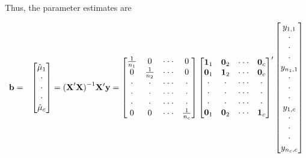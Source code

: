 Thus, the parameter estimates are

\begin{center}
\begin{eqnarray}\label{E4:OneFactorXPrimeXinvXPrimey}
\mathbf{b} &=&%
\begin{bmatrix}
\hat{\mu}_1 \\
\cdot  \\
\cdot  \\
\cdot  \\
\hat{\mu}_{c}%
\end{bmatrix}%
=\mathbf{(X}^{\prime}\mathbf{X)}^{-1}\mathbf{X}^{\prime}\mathbf{y}=%
\begin{bmatrix}
\frac{1}{n_1} & 0 & \cdot \cdot \cdot  & 0 \\
0 & \frac{1}{n_2} & \cdot \cdot \cdot  & 0 \\
\cdot  & \cdot  & \cdot \cdot \cdot  & \cdot  \\
\cdot  & \cdot  & \cdot \cdot \cdot  & \cdot  \\
\cdot  & \cdot  & \cdot \cdot \cdot  & \cdot  \\
0 & 0 & \cdot \cdot \cdot  & \frac{1}{n_c}
\end{bmatrix}
\begin{bmatrix}
\mathbf{1}_1 & \mathbf{0}_2 & \cdot \cdot \cdot  & \mathbf{0}_c \\
\mathbf{0}_1 & \mathbf{1}_2 & \cdot \cdot \cdot  & \mathbf{0}_c \\
\cdot  & \cdot  & \cdot \cdot \cdot  & \cdot  \\
\cdot  & \cdot  & \cdot \cdot \cdot  & \cdot  \\
\cdot  & \cdot  & \cdot \cdot \cdot  & \cdot  \\
\mathbf{0}_1 & \mathbf{0}_2 & \cdot \cdot \cdot  & \mathbf{1}_c%
\end{bmatrix} ^{\prime}
\begin{bmatrix}
y_{1,1} \\
\cdot  \\
\cdot  \\
\cdot  \\
y_{n_1,1} \\
\cdot  \\
\cdot  \\
\cdot  \\
y_{1,c} \\
\cdot  \\
\cdot  \\
\cdot  \\
y_{n_{c},c}%
\end{bmatrix} \notag

\end{eqnarray}
\end{center}
